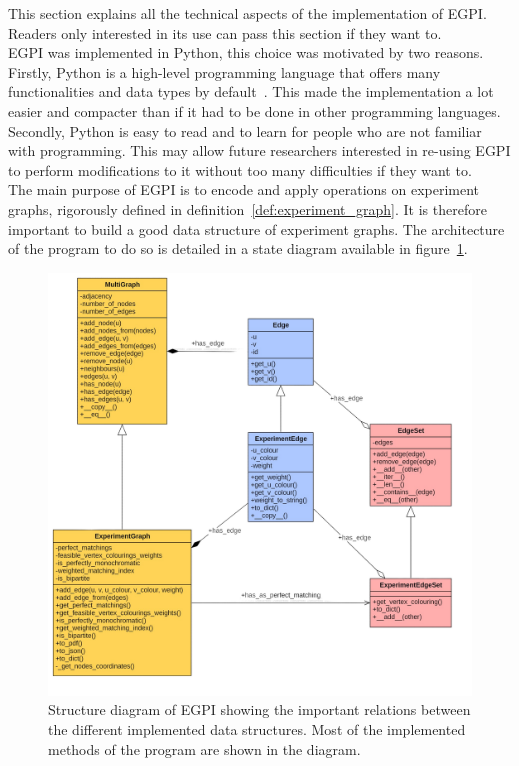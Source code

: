 This section explains all the technical aspects of the implementation of EGPI\@.
Readers only interested in its use can pass this section if they want to.\\

EGPI was implemented in Python, this choice was motivated by two reasons.
Firstly, Python is a high-level programming language that offers many functionalities and data types by default~\cite{python}.
This made the implementation a lot easier and compacter than if it had to be done in other programming languages.
Secondly, Python is easy to read and to learn for people who are not familiar with programming.
This may allow future researchers interested in re-using EGPI to perform modifications to it without too many difficulties if they want to.\\

The main purpose of EGPI is to encode and apply operations on experiment graphs, rigorously defined in definition~\ref{def:experiment_graph}.
It is therefore important to build a good data structure of experiment graphs.
The architecture of the program to do so is detailed in a state diagram available in figure~\ref{fig:structure_diagram}.

\begin{figure}[H]       %
    \centering
    \includegraphics[scale=0.25]{figures/new_results/egpi/structure_diagram}
    \caption{Structure diagram of EGPI showing the important relations between the different implemented data structures. Most of the implemented methods of the program are shown in the diagram.}
    \label{fig:structure_diagram}
\end{figure}


